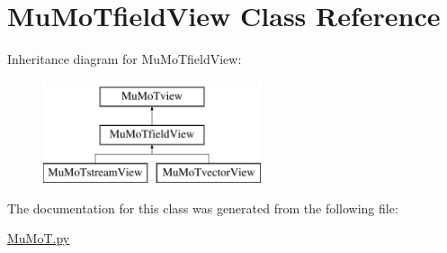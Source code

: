 \hypertarget{class_mu_mo_t_1_1_mu_mo_tfield_view}{}\section{Mu\+Mo\+Tfield\+View Class Reference}
\label{class_mu_mo_t_1_1_mu_mo_tfield_view}
Inheritance diagram for Mu\+Mo\+Tfield\+View\+:\begin{figure}[H]
\begin{center}
\leavevmode
\includegraphics[height=3.000000cm]{class_mu_mo_t_1_1_mu_mo_tfield_view}
\end{center}
\end{figure}


The documentation for this class was generated from the following file\+:\begin{DoxyCompactItemize}
\item 
\hyperlink{_mu_mo_t_8py}{Mu\+Mo\+T.\+py}\end{DoxyCompactItemize}
